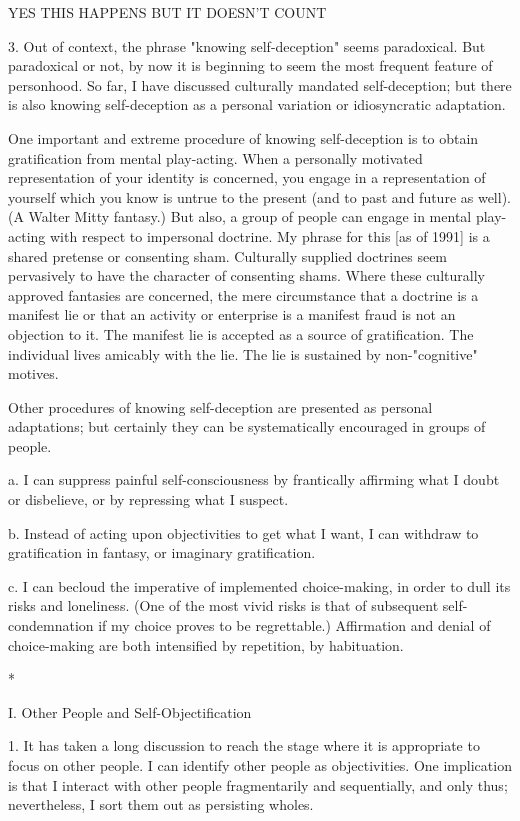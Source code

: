     YES THIS HAPPENS BUT IT DOESN'T COUNT

3. Out of context, the phrase "knowing self-deception" seems paradoxical. But paradoxical or not, by now it is beginning to seem the most frequent feature of personhood. So far, I have discussed culturally mandated self-deception; but there is also knowing self-deception as a personal variation or idiosyncratic adaptation.

One important and extreme procedure of knowing self-deception is to obtain gratification from mental play-acting. When a personally motivated representation of your identity is concerned, you engage in a representation of yourself which you know is untrue to the present (and to past and future as well). (A Walter Mitty fantasy.) But also, a group of people can engage in mental play-acting with respect to impersonal doctrine. My phrase for this [as of 1991] is a shared pretense or consenting sham. Culturally supplied doctrines seem pervasively to have the character of consenting shams. Where these culturally approved fantasies are concerned, the mere circumstance that a doctrine is a manifest lie or that an activity or enterprise is a manifest fraud is not an objection to it. The manifest lie is accepted as a source of gratification. The individual lives amicably with the lie. The lie is sustained by non-"cognitive" motives.

Other procedures of knowing self-deception are presented as personal adaptations; but certainly they can be systematically encouraged in groups of people.

a. I can suppress painful self-consciousness by frantically affirming what I doubt or disbelieve, or by repressing what I suspect.

b. Instead of acting upon objectivities to get what I want, I can withdraw to gratification in fantasy, or imaginary gratification.

c. I can becloud the imperative of implemented choice-making, in order to dull its risks and loneliness. (One of the most vivid risks is that of subsequent self-condemnation if my choice proves to be regrettable.) Affirmation and denial of choice-making are both intensified by repetition, by habituation.

*

I. Other People and Self-Objectification

1. It has taken a long discussion to reach the stage where it is appropriate to focus on other people. I can identify other people as objectivities. One implication is that I interact with other people fragmentarily and sequentially, and only thus; nevertheless, I sort them out as persisting wholes.

